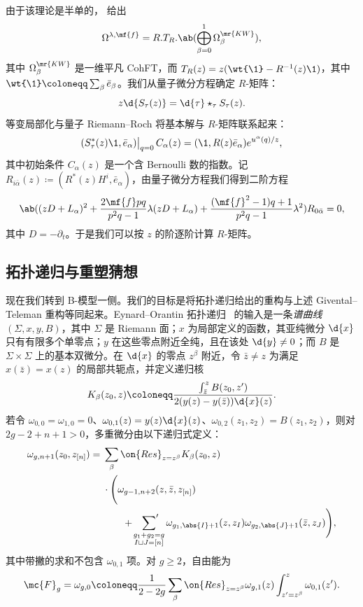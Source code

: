 由于该理论是半单的， 给出
\[ \Omega^{\lambda,\mf{f}} = R.T_R.\ab(\bigoplus_{\beta=0}^1 \Omega^{\mr{KW}}_{\beta}), \]
其中 \(\Omega^{\mr{KW}}_{\beta}\) 是一维平凡 CohFT，而 \(T_R(z) = z(\wt{\1}-R^{-1}(z)\1)\)，其中 \(\wt{\1} \coloneqq \sum_{\beta}\bar{e}_{\beta}\)。我们从量子微分方程确定 \(R\)-矩阵：
\[ z \d{S_{\tau}(z)} = \d{\tau} \star_{\tau} S_{\tau}(z). \]
等变局部化与量子 Riemann--Roch 将基本解与 \(R\)-矩阵联系起来：
\[ (S^*_{\tau}(z)\1, \bar{e}_{\alpha})\big|_{q=0}\, C_{\alpha}(z) = (\1, R(z)\bar{e}_{\alpha})e^{u^{\alpha}(q)/z}, \]
其中初始条件 \(C_{\alpha}(z)\) 是一个含 Bernoulli 数的指数。记 \(R_{i\bar{\alpha}}(z) \coloneqq (R^*(z)H^i, \bar{e}_{\alpha})\)，由量子微分方程我们得到二阶方程
\[ \ab( (zD+L_{\alpha})^2 + \frac{2\mf{f}pq}{p^2q-1}\lambda(zD+L_{\alpha}) + \frac{(\mf{f}^2-1)q+1}{p^2q-1}\lambda^2 )R_{0\bar{\alpha}} = 0, \]
其中 \(D = -\partial_t\)。于是我们可以按 \(z\) 的阶逐阶计算 \(R\)-矩阵。

\subsection{拓扑递归与重塑猜想}%
\label{sub:Topological recursion and the remodeling conjecture}

现在我们转到 B-模型一侧。我们的目标是将拓扑递归给出的重构与上述 Givental--Teleman 重构等同起来。Eynard--Orantin 拓扑递归~\cite{EO2007} 的输入是一条\textit{谱曲线} \((\Sigma,x,y,B)\)，其中 \(\Sigma\) 是 Riemann 面；\(x\) 为局部定义的函数，其亚纯微分 \(\d{x}\) 只有有限多个单零点；\(y\) 在这些零点附近全纯，且在该处 \(\d{y} \neq 0\)；而 \(B\) 是 \(\Sigma \times \Sigma\) 上的基本双微分。在 \(\d{x}\) 的零点 \(z^{\beta}\) 附近，令 \(\bar{z} \neq z\) 为满足 \(x(\bar{z}) = x(z)\) 的局部共轭点，并定义递归核
\[ K_{\beta}(z_0,z) \coloneqq \frac{\int_{\bar{z}}^z B(z_0,z')}{2(y(z)-y(\bar{z}))\d{x}(z)}. \]
若令 \(\omega_{0,0} = \omega_{1,0} = 0\)、\(\omega_{0,1}(z) = y(z)\d{x}(z)\)、\(\omega_{0,2}(z_1,z_2) = B(z_1,z_2)\)，则对 \(2g-2+n+1 > 0\)，多重微分由以下递归式定义：
\begin{align*}
    \omega_{g,n+1}(z_0,z_{[n]}) ={}& \sum_{\beta}\on{Res}_{z = z^{\beta}} K_{\beta}(z_0,z) \\
    &\cdot \Bigg( \omega_{g-1,n+2}(z,\bar{z},z_{[n]}) \\
    &\qquad + \sideset{}{'}\sum_{\substack{g_1+g_2 = g \\ I \sqcup J = [n]}}\omega_{g_1,\abs{I}+1}(z,z_I)\omega_{g_2,\abs{J}+1}(\bar{z},z_J)\Bigg),
\end{align*}
其中带撇的求和不包含 \(\omega_{0,1}\) 项。对 \(g \geq 2\)，自由能为
\[ \mc{F}_g = \omega_{g,0} \coloneqq \frac{1}{2-2g}\sum_{\beta}\on{Res}_{z=z^{\beta}}\omega_{g,1}(z)\int_{z'=z^{\beta}}^z \omega_{0,1}(z'). \]

